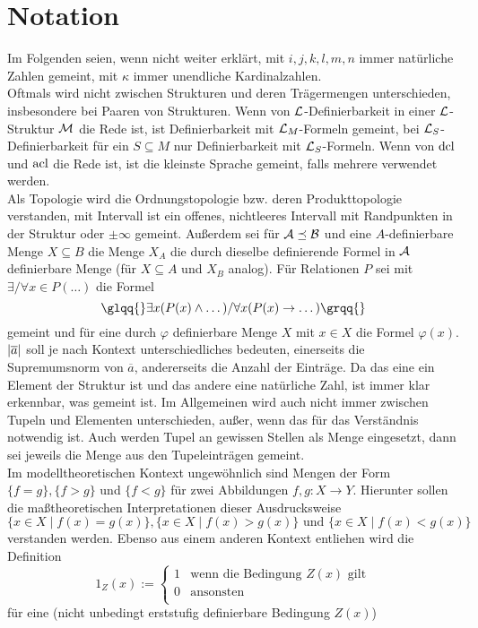 \chapter*{Notation}
Im Folgenden seien, wenn nicht weiter erklärt, mit $i,j,k,l,m,n$ immer natürliche Zahlen gemeint, mit $\kappa$ immer unendliche Kardinalzahlen.\\
Oftmals wird nicht zwischen Strukturen und deren Trägermengen unterschieden, insbesondere bei Paaren von Strukturen. Wenn von $\mathcal{L}$-Definierbarkeit in einer $\mathcal{L}$-Struktur $\mathcal{M}$ die Rede ist, ist Definierbarkeit mit $\mathcal{L}_M$-Formeln gemeint, bei $\mathcal{L}_S$-Definierbarkeit für ein $S\subseteq M$ nur Definierbarkeit mit $\mathcal{L}_S$-Formeln. Wenn von $\operatorname{dcl}$ und $\operatorname{acl}$ die Rede ist, ist die kleinste Sprache gemeint, falls mehrere verwendet werden.\\
Als Topologie wird die Ordnungstopologie bzw. deren Produkttopologie verstanden, mit \glqq{}Intervall\grqq{} ist ein offenes, nichtleeres Intervall mit Randpunkten in der Struktur oder $\pm\infty$ gemeint. Außerdem sei für $\mathcal{A}\preceq \mathcal{B}$ und eine $A$-definierbare Menge $X\subseteq B$ die Menge $X_A$ die durch dieselbe definierende Formel in $\mathcal{A}$ definierbare Menge (für $X\subseteq A$ und $X_B$ analog). Für Relationen $P$ sei mit \glqq{}$\exists/\forall x\in P(\dots)$\grqq{} die Formel $$\glqq{}\exists x(P(x)\land\dots)/\forall x(P(x)\rightarrow\dots)\grqq{}$$ gemeint und für eine durch $\varphi$ definierbare Menge $X$ mit \glqq{}$x\in X$\grqq{} die Formel $\varphi(x)$.\\
${\left| \overline{a} \right|}$ soll je nach Kontext unterschiedliches bedeuten, einerseits die Supremumsnorm von $\overline{a}$, andererseits die Anzahl der Einträge. Da das eine ein Element der Struktur ist und das andere eine natürliche Zahl, ist immer klar erkennbar, was gemeint ist. Im Allgemeinen wird auch nicht immer zwischen Tupeln und Elementen unterschieden, außer, wenn das für das Verständnis notwendig ist. Auch werden Tupel an gewissen Stellen als Menge eingesetzt, dann sei jeweils die Menge aus den Tupeleinträgen gemeint.\\
Im modelltheoretischen Kontext ungewöhnlich sind Mengen der Form $\{f=g\},\{f>g\}$ und $\{f<g\}$ für zwei Abbildungen $f,g:X\rightarrow Y$. Hierunter sollen die maßtheoretischen Interpretationen dieser Ausdrucksweise $$\{x\in X\mid f(x)=g(x)\},\{x\in X\mid f(x)>g(x)\}\text{ und }\{x\in X\mid f(x)<g(x)\}$$ verstanden werden. Ebenso aus einem anderen Kontext entliehen wird die Definition
$$1_Z(x):=\left\{\begin{array}{ll}
1&\text{wenn die Bedingung }Z(x)\text{ gilt}\\
0&\text{ansonsten}\\
\end{array}\right.$$ für eine (nicht unbedingt erststufig definierbare Bedingung $Z(x)$)